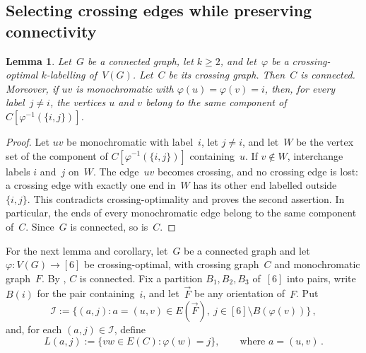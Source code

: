 \documentclass[12pt,reqno,a4paper]{amsart}
\newtheorem{lemma}[theorem]{Lemma}
\begin{document}
\subsection{Selecting crossing edges while preserving connectivity}

\begin{lemma}\label{lem:switching}
  Let~$G$ be a connected graph, let $k\ge2$, and let~$\varphi$ be a
  crossing-optimal $k$-labelling of~$V(G)$. 
  Let~$C$ be its crossing graph.
  Then~$C$ is connected.
  Moreover, if $uv$ is monochromatic with $\varphi(u) = \varphi(v) = i$, then,
  for every label~$j\neq i$, the vertices $u$ and $v$ belong to the same
  component of $C[\varphi^{-1}(\{i,j\})]$.
\end{lemma}
\begin{proof}
  Let $uv$ be monochromatic with label~$i$, let $j\neq i$, and let~$W$ be the
  vertex set of the component of $C[\varphi^{-1}(\{i,j\})]$ containing~$u$.
  If $v\notin W$, interchange labels $i$ and~$j$ on~$W$. 
  The edge~$uv$ becomes crossing, and no crossing edge is lost: a crossing edge
  with exactly one end in~$W$ has its other end labelled outside~$\{i,j\}$.
  This contradicts crossing-optimality and proves the second assertion.
  In particular, the ends of every monochromatic edge belong to the same
  component of~$C$.
  Since~$G$ is connected, so is~$C$.
\end{proof}

For the next lemma and corollary, let~$G$ be a connected graph and let
$\varphi\colon V(G)\to[6]$ be crossing-optimal, with crossing graph~$C$ and
monochromatic graph~$F$. 
By , $C$ is connected.
Fix a partition $B_1,B_2,B_3$ of~$[6]$ into pairs, write~$B(i)$ for the pair
containing~$i$, and let~$\vec F$ be any orientation of~$F$. Put
\[
  \mathcal I := \{(a,j) \colon a = (u,v) \in E(\vec F),\
                   j \in [6] \setminus B(\varphi(v))\} \, ,
\]
and, for each $(a,j) \in \mathcal I$, define
\[
  L(a,j) := \{vw\in E(C) \colon \varphi(w) = j\},
  \qquad \text{where } a = (u,v) \,.
\]
\end{document}
